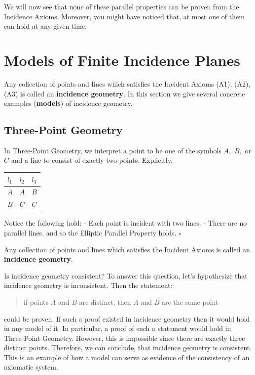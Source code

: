 \documentclass[
  twoside,
  12pt,
  letterpaper,
  fleqn]{article}
\theoremstyle{definition}
\theoremstyle{definition}
\theoremstyle{plain}
\theoremstyle{plain}
\theoremstyle{remark}
\begin{document}
We will now see that none of these parallel properties can be proven
from the Incidence Axioms. Moreover, you might have noticed that, at
most one of them can hold at any given time.

\hypertarget{models-of-finite-incidence-planes}{%
\section{Models of Finite Incidence
Planes}\label{models-of-finite-incidence-planes}}

Any collection of points and lines which satisfies the Incident Axioms
(A1), (A2), (A3) is called an \textbf{incidence geometry}. In this
section we give several concrete examples (\textbf{models}) of incidence
geometry.

\hypertarget{three-point-geometry}{%
\subsection{Three-Point Geometry}\label{three-point-geometry}}

In Three-Point Geometry, we interpret a point to be one of the symbols
\(A,\) \(B,\) or \(C\) and a line to consist of exactly two points.
Explicitly,

\begin{longtable}[]{@{}lll@{}}
\toprule()
\(l_1\) & \(l_2\) & \(l_3\) \\
\midrule()
\endhead
\(A\) & \(A\) & \(B\) \\
\(B\) & \(C\) & \(C\) \\
\bottomrule()
\end{longtable}

Notice the following hold: - Each point is incident with two lines. -
There are no parallel lines, and so the Elliptic Parallel Property
holds. \(\square\)

Any collection of points and lines which satisfies the Incident Axioms
is called an \textbf{incidence geometry}.

Is incidence geometry consistent? To answer this question, let's
hypothesize that incidence geometry is inconsistent. Then the statement:

\begin{quote}
if points \(A\) and \(B\) are distinct, then \(A\) and \(B\) are the
same point
\end{quote}

could be proven. If such a proof existed in incidence geometry then it
would hold in any model of it. In particular, a proof of such a
statement would hold in Three-Point Geometry. However, this is
impossible since there are exactly three distinct points. Therefore, we
can conclude, that incidence geometry is consistent. This is an example
of how a model can serve as evidence of the consistency of an axiomatic
system.
\end{document}
